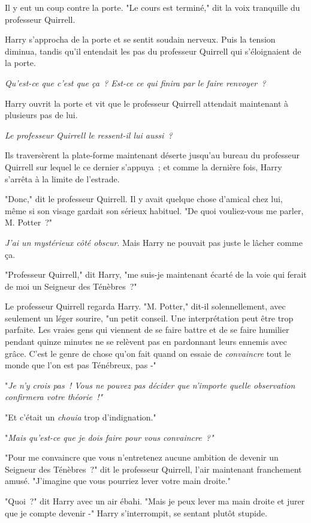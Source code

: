 Il y eut un coup contre la porte. "Le cours est terminé," dit la voix tranquille du professeur Quirrell.

Harry s'approcha de la porte et se sentit soudain nerveux. Puis la tension diminua, tandis qu'il entendait les pas du professeur Quirrell qui s'éloignaient de la porte.

\emph{Qu'est-ce que c'est que ça~? Est-ce ce qui finira par le faire renvoyer~?}

Harry ouvrit la porte et vit que le professeur Quirrell attendait maintenant à plusieurs pas de lui.

\emph{Le professeur Quirrell le ressent-il lui aussi~?}

Ils traversèrent la plate-forme maintenant déserte jusqu'au bureau du professeur Quirrell sur lequel le ce dernier s'appuya~; et comme la dernière fois, Harry s'arrêta à la limite de l'estrade.

"Donc," dit le professeur Quirrell. Il y avait quelque chose d'amical chez lui, même si son visage gardait son sérieux habituel. "De quoi vouliez-vous me parler, M. Potter~?"

\emph{J'ai un mystérieux côté obscur}. Mais Harry ne pouvait pas juste le lâcher comme ça.

"Professeur Quirrell," dit Harry, "me suis-je maintenant écarté de la voie qui ferait de moi un Seigneur des Ténèbres~?"

Le professeur Quirrell regarda Harry. "M. Potter," dit-il solennellement, avec seulement un léger sourire, "un petit conseil. Une interprétation peut être trop parfaite. Les vraies gens qui viennent de se faire battre et de se faire humilier pendant quinze minutes ne se relèvent pas en pardonnant leurs ennemis avec grâce. C'est le genre de chose qu'on fait quand on essaie de \emph{convaincre} tout le monde que l'on est pas Ténébreux, pas -"

"\emph{Je n'y crois pas~! Vous ne pouvez pas décider que n'importe quelle observation confirmera votre théorie~!"}

"Et c'était un \emph{chouia} trop d'indignation."

"\emph{Mais qu'est-ce que je dois faire pour vous convaincre~?"}

"Pour me convaincre que vous n'entretenez aucune ambition de devenir un Seigneur des Ténèbres~?" dit le professeur Quirrell, l'air maintenant franchement amusé. "J'imagine que vous pourriez lever votre main droite."

"Quoi~?" dit Harry avec un air ébahi. "Mais je peux lever ma main droite et jurer que je compte devenir -" Harry s'interrompit, se sentant plutôt stupide.

